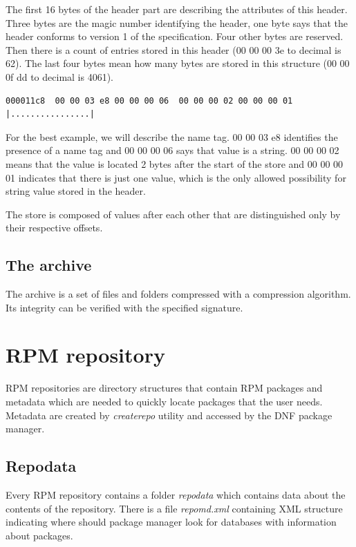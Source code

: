 The first 16 bytes of the header part are describing the attributes of this header. Three bytes are
the magic number identifying the header, one byte says that the header conforms to version 1 of the specification.
Four other bytes are reserved. Then there is a count of entries stored in this header
(00 00 00 3e to decimal is 62). The last four bytes mean how many bytes are stored in this structure
(00 00 0f dd to decimal is 4061).

\begin{lstlisting}
000011c8  00 00 03 e8 00 00 00 06  00 00 00 02 00 00 00 01  |................|
\end{lstlisting}

For the best example, we will describe the name tag. 00 00 03 e8 identifies the presence of
a name tag and 00 00 00 06 says that value is a string. 00 00 00 02 means that the value
is located 2 bytes after the start of the store and 00 00 00 01 indicates that there is
just one value, which is the only allowed possibility for string value stored in the header.

The store is composed of values after each other that are distinguished only by their respective offsets.

\subsection*{The archive}
The archive is a set of files and folders compressed with a compression algorithm. Its integrity
can be verified with the specified signature.

\section{RPM repository}
RPM repositories are directory structures that contain RPM packages and metadata which are needed
to quickly locate packages that the user needs. Metadata are created by \textit{createrepo} \cite{RPMRepository}
utility and accessed by the DNF package manager. 

\subsection*{Repodata}
Every RPM repository contains a folder \textit{repodata} which contains data about the contents of the
repository. There is a file \textit{repomd.xml} containing XML structure indicating where should
package manager look for databases with information about packages.

